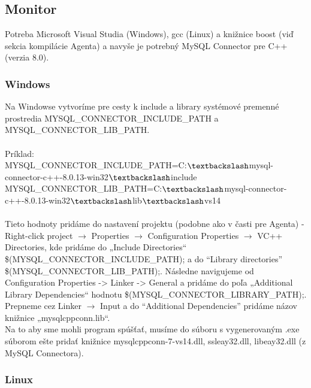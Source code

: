\documentclass[a4paper,12pt]{article}
\begin{document}
\subsection{Monitor}

Potreba Microsoft Visual Studia (Windows), gcc (Linux) a knižnice boost (viď sekcia kompilácie Agenta) a navyše je potrebný MySQL Connector pre C++ (verzia 8.0).

\subsubsection{Windows}

Na Windowse vytvoríme pre cesty k include a library systémové premenné prostredia MYSQL\_CONNECTOR\_INCLUDE\_PATH a MYSQL\_CONNECTOR\_LIB\_PATH. \\ \\
Príklad: \\
MYSQL\_CONNECTOR\_INCLUDE\_PATH=C:$\textbackslash$mysql-connector-c++-8.0.13-win32$\textbackslash$include \\
MYSQL\_CONNECTOR\_LIB\_PATH=C:$\textbackslash$mysql-connector-c++-8.0.13-win32$\textbackslash$lib$\textbackslash$vs14 \\ \\
Tieto hodnoty pridáme do nastavení projektu (podobne ako v časti pre Agenta) - Right-click project $\rightarrow$ Properties $\rightarrow$ Configuration Properties $\rightarrow$ VC++ Directories, kde pridáme do „Include Directories“ \$(MYSQL\_CONNECTOR\_INCLUDE\_PATH); a do “Library directories” \$(MYSQL\_CONNECTOR\_LIB\_PATH);. Následne navigujeme od Configuration Properties -> Linker -> General a pridáme do poľa „Additional Library Dependencies“ hodnotu \$(MYSQL\_CONNECTOR\_LIBRARY\_PATH);. Prepneme cez Linker $\rightarrow$ Input a do “Additional Dependencies” pridáme názov knižnice „mysqlcppconn.lib“. \\ 
Na to aby sme mohli program spúšťať, musíme do súboru s vygenerovaným .exe súborom ešte pridať knižnice mysqlcppconn-7-vs14.dll, ssleay32.dll, libeay32.dll (z MySQL Connectora).

\subsubsection{Linux}
\end{document}

